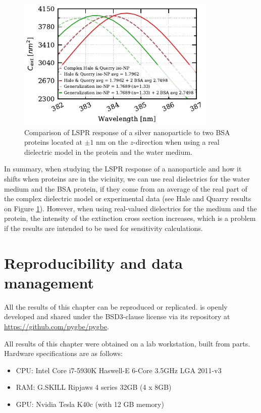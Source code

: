  \begin{figure} %
    \centering
    \includegraphics[width=0.85\textwidth]{bsa_phan_avg_real_water_diel.pdf} 
    \caption{Comparison of LSPR response of a silver nanoparticle to two BSA proteins located at $\pm1$ nm on the $z$-direction
    when using a real dielectric model in the protein and the water medium.}
    \label{fig:bsa_w_real}
 \end{figure}

In summary, when studying the LSPR response of a nanoparticle and how it shifts when proteins are in the vicinity, we can use 
real dielectrics for the water medium and the BSA protein, if they come from an average of the real part of the complex dielectric model 
or experimental data (see Hale and Quarry results on Figure \ref{fig:bsa_w_real}). However, when using real-valued dielectrics for the medium 
and the protein, the intensity of the extinction cross section increases, which is a problem if the results are intended to be used for 
sensitivity calculations. 

\section{Reproducibility and data management} \label{sec:repro_ell}
 
All the results of this chapter can be reproduced or replicated. \pygbe is openly developed and 
shared under the BSD3-clause license via its repository at \url{https://github.com/pygbe/pygbe}.

All results of this chapter were obtained on a lab workstation, built from parts. Hardware specifications are as follows:

\begin{itemize}
  \item CPU: Intel Core i7-5930K Haswell-E 6-Core 3.5GHz LGA 2011-v3
  \item RAM: G.SKILL Ripjaws 4 series 32GB (4 x 8GB)
  \item GPU: Nvidia Tesla K40c (with 12 GB memory)
\end{itemize}

